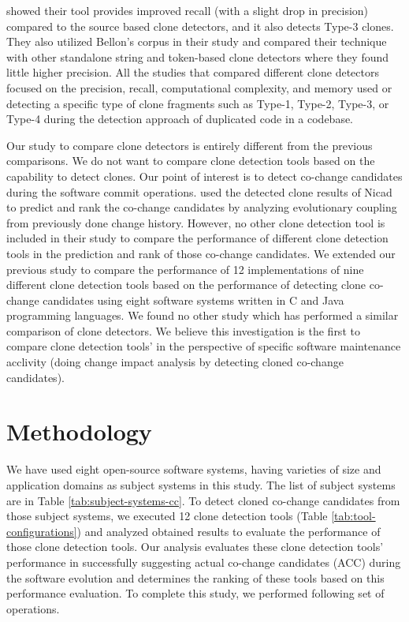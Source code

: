 \documentclass[review]{elsarticle}
\begin{document}
\citet{CloneIntermediateRepresentationBallon} showed their tool provides improved recall (with a slight drop in precision) compared to the source based clone detectors, and it also detects Type-3 clones. They also utilized Bellon’s corpus in their study and compared their technique with other standalone string and token-based clone detectors where they found little higher precision. All the studies that compared different clone detectors focused on the precision, recall, computational complexity, and memory used or detecting a specific type of clone fragments such as Type-1, Type-2, Type-3, or Type-4 during the detection approach of duplicated code in a codebase. 

Our study to compare clone detectors is entirely different from the previous comparisons. We do not want to compare clone detection tools based on the capability to detect clones. Our point of interest is to detect co-change candidates during the software commit operations. \citet{Mondal-2014-PRC-2597073-2597104rankingCoChange} used the detected clone results of Nicad to predict and rank the co-change candidates by analyzing evolutionary coupling from previously done change history. However, no other clone detection tool is included in their study to compare the performance of different clone detection tools in the prediction and rank of those co-change candidates. We extended our previous study \cite{nadim-iwsc-2020} to compare the performance of 12 implementations of nine different clone detection tools based on the performance of detecting clone co-change candidates using eight software systems written in C and Java programming languages.  We found no other study which has performed a similar comparison of clone detectors. We believe this investigation is the first to compare clone detection tools' in the perspective of specific software maintenance acclivity (doing change impact analysis by detecting cloned co-change candidates). 

\section{Methodology}
\label{the-methodology}
We have used eight open-source software systems, having varieties of size and application domains as subject systems in this study. The list of subject systems are in Table \ref{tab:subject-systems-cc}. To detect cloned co-change candidates from those subject systems, we executed 12 clone detection tools (Table \ref{tab:tool-configurations}) and analyzed obtained results to evaluate the performance of those clone detection tools. Our analysis evaluates these clone detection tools' performance in successfully suggesting actual co-change candidates (ACC) during the software evolution and determines the ranking of these tools based on this performance evaluation. To complete this study, we performed following set of operations. 
\end{document}

